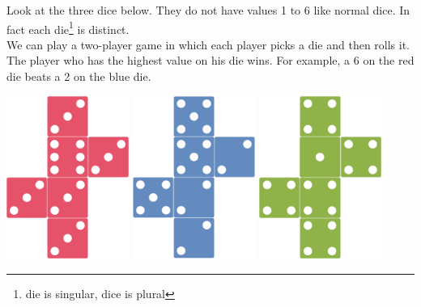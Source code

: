 \documentclass[12pt,a4paper]{nsiarticle}
\begin{document}
\maketitle
Look at the three dice below. They do not have values 1 to 6 like normal dice. 
In fact each die\footnote{die is singular, dice is plural
} is distinct.\\
We can play a two-player game in which each player picks a die and then rolls it. The player who has the
highest value on his die wins. For example, a 6 on the red die beats a 2 on the blue die. 
\begin{center}
    \includegraphics[width=4cm]{img/red_die.png}
    \hspace{1cm}
    \includegraphics[width=4cm]{img/blue_die.png}
    \hspace{1cm}
    \includegraphics[width=4cm]{img/green_die.png}          
\end{center}
    
\end{document}
